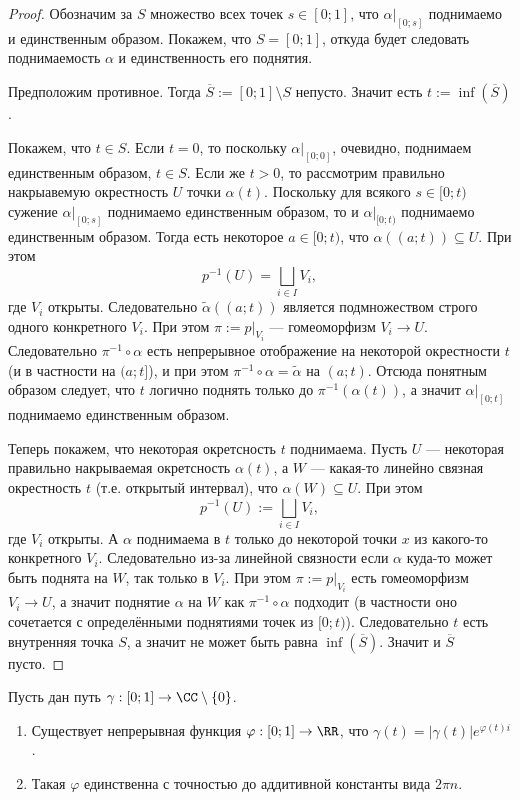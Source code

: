 \documentclass[12pt,a4paper]{article}
\begin{document}
    \begin{proof}
        Обозначим за $S$ множество всех точек $s \in [0; 1]$, что $\alpha|_{[0; s]}$ поднимаемо и единственным образом. Покажем, что $S = [0; 1]$, откуда будет следовать поднимаемость $\alpha$ и единственность его поднятия.

        Предположим противное. Тогда $\overline{S} := [0; 1] \setminus S$ непусто. Значит есть $t := \inf(\overline{S})$.
        
        Покажем, что $t \in S$. Если $t = 0$, то поскольку $\alpha|_{[0;0]}$, очевидно, поднимаем единственным образом, $t \in S$. Если же $t > 0$, то рассмотрим правильно накрыавемую окрестность $U$ точки $\alpha(t)$. Поскольку для всякого $s \in [0; t)$ сужение $\alpha|_{[0; s]}$ поднимаемо единственным образом, то и $\alpha|_{[0; t)}$ поднимаемо единственным образом. Тогда есть некоторое $a \in [0; t)$, что $\alpha((a; t)) \subseteq U$. При этом
        \[p^{-1}(U) = \bigsqcup_{i \in I} V_i,\]
        где $V_i$ открыты. Следовательно $\tilde{\alpha}((a; t))$ является подмножеством строго одного конкретного $V_i$. При этом $\pi := p|_{V_i}$ --- гомеоморфизм $V_i \to U$. Следовательно $\pi^{-1} \circ \alpha$ есть непрерывное отображение на некоторой окрестности $t$ (и в частности на $(a; t]$), и при этом $\pi^{-1} \circ \alpha = \tilde{\alpha}$ на $(a; t)$. Отсюда понятным образом следует, что $t$ логично поднять только до $\pi^{-1}(\alpha(t))$, а значит $\alpha|_{[0; t]}$ поднимаемо единственным образом.

        Теперь покажем, что некоторая окретсность $t$ поднимаема. Пусть $U$ --- некоторая правильно накрываемая окретсность $\alpha(t)$, а $W$ --- какая-то линейно связная окрестность $t$ (т.е. открытый интервал), что $\alpha(W) \subseteq U$. При этом
        \[p^{-1}(U) := \bigsqcup_{i \in I} V_i,\]
        где $V_i$ открыты. А $\alpha$ поднимаема в $t$ только до некоторой точки $x$ из какого-то конкретного $V_i$. Следовательно из-за линейной связности если $\alpha$ куда-то может быть поднята на $W$, так только в $V_i$. При этом $\pi := p|_{V_i}$ есть гомеоморфизм $V_i \to U$, а значит поднятие $\alpha$ на $W$ как $\pi^{-1} \circ \alpha$ подходит (в частности оно сочетается с определёнными поднятиями точек из $[0; t)$). Следовательно $t$ есть внутренняя точка $S$, а значит не может быть равна $\inf(\overline{S})$. Значит и $\overline{S}$ пусто.
    \end{proof}

    \begin{lemma}
        Пусть дан путь $\gamma: [0; 1] \to \CC \setminus \{0\}$.
        \begin{enumerate}
            \item Существует непрерывная функция $\varphi: [0; 1] \to \RR$, что $\gamma(t) = |\gamma(t)| e^{\varphi(t)i}$.
            \item Такая $\varphi$ единственна с точностью до аддитивной константы вида $2\pi n$.
        \end{enumerate}
    \end{lemma}
\end{document}
